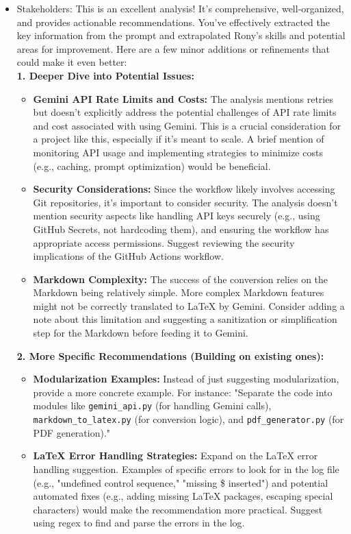 \documentclass{article}
\begin{document}
\begin{itemize}
\begin{itemize}
        \item Stakeholders: This is an excellent analysis! It's comprehensive, well-organized, and provides actionable recommendations. You've effectively extracted the key information from the prompt and extrapolated Rony's skills and potential areas for improvement.  Here are a few minor additions or refinements that could make it even better:\\
        \textbf{1. Deeper Dive into Potential Issues:}
        \begin{itemize}
            \item \textbf{Gemini API Rate Limits and Costs:}  The analysis mentions retries but doesn't explicitly address the potential challenges of API rate limits and cost associated with using Gemini.  This is a crucial consideration for a project like this, especially if it's meant to scale. A brief mention of monitoring API usage and implementing strategies to minimize costs (e.g., caching, prompt optimization) would be beneficial.
            \item \textbf{Security Considerations:} Since the workflow likely involves accessing Git repositories, it's important to consider security. The analysis doesn't mention security aspects like handling API keys securely (e.g., using GitHub Secrets, not hardcoding them), and ensuring the workflow has appropriate access permissions. Suggest reviewing the security implications of the GitHub Actions workflow.
            \item \textbf{Markdown Complexity:}  The success of the conversion relies on the Markdown being relatively simple. More complex Markdown features might not be correctly translated to LaTeX by Gemini.  Consider adding a note about this limitation and suggesting a sanitization or simplification step for the Markdown before feeding it to Gemini.
        \end{itemize}
\textbf{2. More Specific Recommendations (Building on existing ones):}
\begin{itemize}
    \item \textbf{Modularization Examples:}  Instead of just suggesting modularization, provide a more concrete example. For instance: "Separate the code into modules like \texttt{gemini\_api.py} (for handling Gemini calls), \texttt{markdown\_to\_latex.py} (for conversion logic), and \texttt{pdf\_generator.py} (for PDF generation)."
    \item \textbf{LaTeX Error Handling Strategies:}  Expand on the LaTeX error handling suggestion.  Examples of specific errors to look for in the log file (e.g., "undefined control sequence," "missing \$ inserted") and potential automated fixes (e.g., adding missing LaTeX packages, escaping special characters) would make the recommendation more practical.  Suggest using regex to find and parse the errors in the log.

\end{itemize}
\end{itemize}
\end{itemize}
\end{document}
